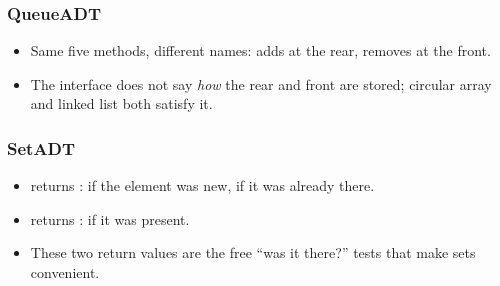 \documentclass[aspectratio=169,10pt,compress]{beamer}
\begin{document}
\begin{frame}[t,fragile] \frametitle{QueueADT}
  \begin{itemize}\small
    \item Same five methods, different names:  adds at
          the rear,  removes at the front.
    \item The interface does not say \emph{how} the rear and front
          are stored; circular array and linked list both satisfy it.
  \end{itemize}
\end{frame}




\begin{frame}[t,fragile] \frametitle{SetADT}
  \begin{itemize}\small
    \item {} returns :  if the element
          was new,  if it was already there.
    \item {} returns :  if it was present.
    \item These two return values are the free ``was it there?'' tests
          that make sets convenient.
  \end{itemize}
\end{frame}
\end{document}
